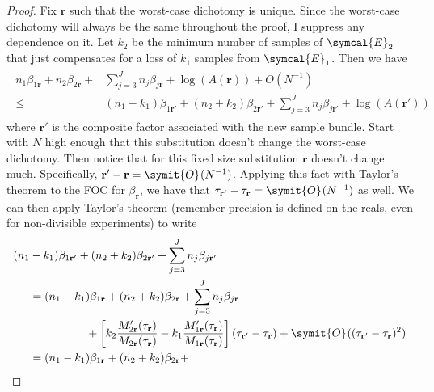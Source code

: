 \documentclass{fancyArticle}
\providecommand{\E}{\symcal{E}}             %
\renewcommand{\|}{\,|\,}                    %
\providecommand{\;}{\,;}                    %
\renewcommand{\O}{\symit{O}\:\!}            %
\begin{document}
\begin{appendix}
  \begin{proof}
    Fix $\mathbf{r}$ such that the worst-case dichotomy is unique.
    Since the worst-case dichotomy will always be the same throughout the proof, I suppress any dependence on it.
    Let $k_2$ be the minimum number of samples of $\E_2$ that just compensates for a loss of $k_1$ samples from $\E_1$.
    Then we have
    \begin{align}
      \begin{split}
        n_1\beta_{1\mathbf{r}} + n_2\beta_{2\mathbf{r}} +
        & \sum_{j=3}^{J}n_j\beta_{j\mathbf{r}} + \log(A(\mathbf{r})) + O(N^{-1})\\
        \leq&
        (n_1-k_1)\beta_{1\mathbf{r}'} + (n_2+k_2)\beta_{2\mathbf{r}'} +
        \sum_{j=3}^{J}n_j\beta_{j\mathbf{r}'} + \log(A(\mathbf{r}'))
      \end{split}\label{eq:drs}
    \end{align}
    where $\mathbf{r}'$ is the composite factor associated with the new sample bundle.
    Start with $N$ high enough that this substitution doesn't change the worst-case dichotomy.
    Then notice that for this fixed size substitution $\mathbf{r}$ doesn't change much.
    Specifically, $\mathbf{r}'-\mathbf{r} = \O(N^{-1})$.
    Applying this fact with Taylor's theorem to the FOC for $\beta_{\mathbf{r}}$, we have that $\tau_{\mathbf{r}'}-\tau_{\mathbf{r}}=\O(N^{-1})$ as well.
    We can then apply Taylor's theorem (remember precision is defined on the reals, even for non-divisible experiments) to write
    \begin{align*}
      (n_1 & -k_1)\beta_{1\mathbf{r}'} + (n_2+k_2)\beta_{2\mathbf{r}'}
             + \sum_{j=3}^{J}n_j\beta_{j\mathbf{r}'}                          \\
           & =
             (n_1-k_1)\beta_{1\mathbf{r}} + (n_2+k_2)\beta_{2\mathbf{r}} +
             \sum_{j=3}^{J}n_j\beta_{j\mathbf{r}}                             \\
           & \hspace{5em} + \left[
             k_2\frac{M'_{2\mathbf{r}}(\tau_{\mathbf{r}})}
             {M_{2\mathbf{r}}(\tau_{\mathbf{r}})} -
             k_1\frac{M'_{1\mathbf{r}}(\tau_{\mathbf{r}})}
             {M_{1\mathbf{r}}(\tau_{\mathbf{r}})}
             \right](\tau_{\mathbf{r}'}-\tau_{\mathbf{r}}) +
             \O((\tau_{\mathbf{r}'}-\tau_{\mathbf{r}})^2)                     \\
           & =
             (n_1-k_1)\beta_{1\mathbf{r}} + (n_2+k_2)\beta_{2\mathbf{r}} +

\end{align*}
\end{proof}
\end{appendix}
\end{document}
